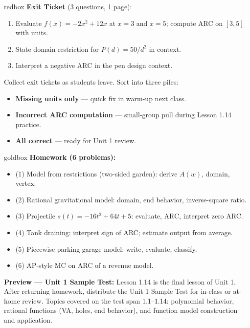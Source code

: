 \documentclass[10pt]{article}
\begin{document}
\begin{skillbox}{redbox}
\textbf{Exit Ticket} (3 questions, 1 page):
\begin{enumerate}[leftmargin=1.2em,itemsep=2pt,topsep=2pt]
  \item Evaluate $f(x) = -2x^2 + 12x$ at $x = 3$ and $x = 5$; compute ARC on $[3, 5]$ with units.
  \item State domain restriction for $P(d) = 50/d^2$ in context.
  \item Interpret a negative ARC in the pen design context.
\end{enumerate}

Collect exit tickets as students leave. Sort into three piles:
\begin{itemize}[leftmargin=1.2em,itemsep=2pt,topsep=2pt]
  \item \textbf{Missing units only} --- quick fix in warm-up next class.
  \item \textbf{Incorrect ARC computation} --- small-group pull during Lesson 1.14 practice.
  \item \textbf{All correct} --- ready for Unit 1 review.
\end{itemize}
\end{skillbox}

\begin{skillbox}{goldbox}
\textbf{Homework (6 problems):}
\begin{itemize}[leftmargin=1.2em,itemsep=2pt,topsep=2pt]
  \item (1) Model from restrictions (two-sided garden): derive $A(w)$, domain, vertex.
  \item (2) Rational gravitational model: domain, end behavior, inverse-square ratio.
  \item (3) Projectile $s(t) = -16t^2 + 64t + 5$: evaluate, ARC, interpret zero ARC.
  \item (4) Tank draining: interpret sign of ARC; estimate output from average.
  \item (5) Piecewise parking-garage model: write, evaluate, classify.
  \item (6) AP-style MC on ARC of a revenue model.
\end{itemize}

\textbf{Preview --- Unit 1 Sample Test:} Lesson 1.14 is the final lesson of Unit 1.
After returning homework, distribute the Unit 1 Sample Test for in-class or at-home review.
Topics covered on the test span 1.1--1.14: polynomial behavior, rational functions (VA, holes,
end behavior), and function model construction and application.
\end{skillbox}
\end{document}

